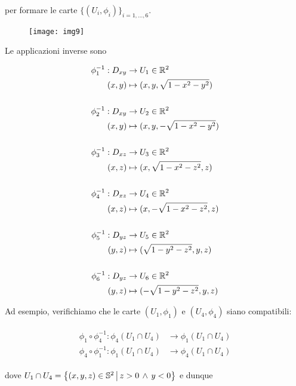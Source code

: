 per formare le carte $ \{(U_{i},\phi_{i})\}_{i=1,\dots,6} $.

\begin{figure}[H]
	\centering
	\texttt{[image: img9]}
\end{figure}

Le applicazioni inverse sono

\begin{align}
	\begin{split}
		\phi_{1}^{-1} : D_{xy} &\to U_{1} \in \R^{2}\\
		(x,y) &\mapsto (x,y,\sqrt{1-x^{2}-y^{2}})\\\\
		\phi_{2}^{-1} : D_{xy} &\to U_{2} \in \R^{2}\\
		(x,y) &\mapsto (x,y,-\sqrt{1-x^{2}-y^{2}})\\\\
		\phi_{3}^{-1} : D_{xz} &\to U_{3} \in \R^{2}\\
		(x,z) &\mapsto (x,\sqrt{1-x^{2}-z^{2}},z)\\\\
		\phi_{4}^{-1} : D_{xz} &\to U_{4} \in \R^{2}\\
		(x,z) &\mapsto (x,-\sqrt{1-x^{2}-z^{2}},z)\\\\
		\phi_{5}^{-1} : D_{yz} &\to U_{5} \in \R^{2}\\
		(y,z) &\mapsto (\sqrt{1-y^{2}-z^{2}},y,z)\\\\
		\phi_{6}^{-1} : D_{yz} &\to U_{6} \in \R^{2}\\
		(y,z) &\mapsto (-\sqrt{1-y^{2}-z^{2}},y,z)
	\end{split}
\end{align}

Ad esempio, verifichiamo che le carte $ (U_{1},\phi_{1}) $ e $ (U_{4},\phi_{4}) $ siano compatibili:

\begin{align}
	\begin{split}
		\phi_{1} \circ \phi_{4}^{-1} : \phi_{4}(U_{1} \cap U_{4}) &\to \phi_{1}(U_{1} \cap U_{4})\\
		\phi_{4} \circ \phi_{1}^{-1} : \phi_{1}(U_{1} \cap U_{4}) &\to \phi_{4}(U_{1} \cap U_{4})
	\end{split}
\end{align}

dove $ U_{1} \cap U_{4} = \left\{ (x,y,z) \in \S^{2} \, \middle| \, z>0 \, \wedge \, y<0 \right\} $ e dunque 

